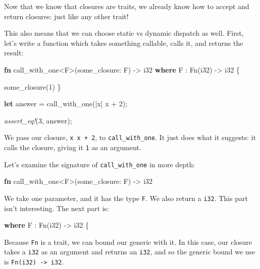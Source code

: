 \documentclass[a4paper,]{book}
\newenvironment{Shaded}{\begin{snugshade}}{\end{snugshade}}
\newcommand{\KeywordTok}[1]{\textcolor[rgb]{0.13,0.29,0.53}{\textbf{{#1}}}}
\newcommand{\DataTypeTok}[1]{\textcolor[rgb]{0.13,0.29,0.53}{{#1}}}
\newcommand{\DecValTok}[1]{\textcolor[rgb]{0.00,0.00,0.81}{{#1}}}
\newcommand{\BuiltInTok}[1]{{#1}}
\newcommand{\PreprocessorTok}[1]{\textcolor[rgb]{0.56,0.35,0.01}{\textit{{#1}}}}
\newcommand{\NormalTok}[1]{{#1}}
\begin{document}
Now that we know that closures are traits, we already know how to accept
and return closures: just like any other trait!

This also means that we can choose static vs dynamic dispatch as well.
First, let's write a function which takes something callable, calls it,
and returns the result:

\begin{Shaded}
\begin{Highlighting}[]
\KeywordTok{fn} \NormalTok{call_with_one<F>(some_closure: F) -> }\DataTypeTok{i32}
    \KeywordTok{where} \NormalTok{F : }\BuiltInTok{Fn}\NormalTok{(}\DataTypeTok{i32}\NormalTok{) -> }\DataTypeTok{i32} \NormalTok{\{}

    \NormalTok{some_closure(}\DecValTok{1}\NormalTok{)}
\NormalTok{\}}

\KeywordTok{let} \NormalTok{answer = call_with_one(|x| x + }\DecValTok{2}\NormalTok{);}

\PreprocessorTok{assert_eq!}\NormalTok{(}\DecValTok{3}\NormalTok{, answer);}
\end{Highlighting}
\end{Shaded}

We pass our closure, \texttt{\textbar{}x\textbar{}\ x\ +\ 2}, to
\texttt{call\_with\_one}. It just does what it suggests: it calls the
closure, giving it \texttt{1} as an argument.

Let's examine the signature of \texttt{call\_with\_one} in more depth:

\begin{Shaded}
\begin{Highlighting}[]
\KeywordTok{fn} \NormalTok{call_with_one<F>(some_closure: F) -> }\DataTypeTok{i32}
\end{Highlighting}
\end{Shaded}

We take one parameter, and it has the type \texttt{F}. We also return a
\texttt{i32}. This part isn't interesting. The next part is:

\begin{Shaded}
\begin{Highlighting}[]
    \KeywordTok{where} \NormalTok{F : }\BuiltInTok{Fn}\NormalTok{(}\DataTypeTok{i32}\NormalTok{) -> }\DataTypeTok{i32} \NormalTok{\{}
\end{Highlighting}
\end{Shaded}

Because \texttt{Fn} is a trait, we can bound our generic with it. In
this case, our closure takes a \texttt{i32} as an argument and returns
an \texttt{i32}, and so the generic bound we use is
\texttt{Fn(i32)\ -\textgreater{}\ i32}.
\end{document}
